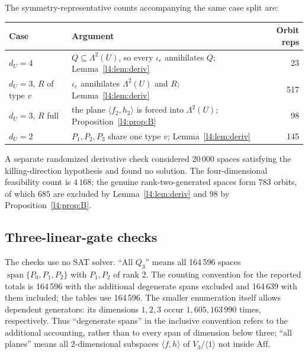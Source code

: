 \documentclass[11pt,a4paper]{article}
\theoremstyle{plain}
\theoremstyle{remark}
\newcommand{\Aff}{\mathrm{Aff}}
\newcommand{\Span}{\operatorname{span}}
\newcommand{\Lam}{\Lambda^2}
\newcommand{\dU}{d_U}
\begin{document}
The symmetry-representative counts accompanying the same case split are:
\begin{center}
\begin{tabularx}{0.92\textwidth}{@{}l X r@{}}
\toprule
Case & Argument & Orbit reps \\
\midrule
$\dU=4$ & $Q\subseteq\Lam(U)$, so every $\iota_e$ annihilates $Q$; Lemma~\ref{l4:lem:deriv} & 23\\
$\dU=3$, $R$ of type $v$ & $\iota_e$ annihilates $\Lam(U)$ and $R$; Lemma~\ref{l4:lem:deriv} & 517\\
$\dU=3$, $R$ full & the plane $\langle f_2,h_2\rangle$ is forced into $\Lam(U)$; Proposition~\ref{l4:prop:B} & 98\\
$\dU=2$ & $P_1,P_2,P_3$ share one type $v$; Lemma~\ref{l4:lem:deriv} & 145\\
\bottomrule
\end{tabularx}
\end{center}
A separate randomized derivative check considered $20\,000$ spaces satisfying the killing-direction hypothesis and found no solution. The four-dimensional feasibility count is $4\,168$; the genuine rank-two-generated spaces form $783$ orbits, of which $685$ are excluded by Lemma~\ref{l4:lem:deriv} and $98$ by Proposition~\ref{l4:prop:B}.
\subsection{Three-linear-gate checks}
The checks use no SAT solver. ``All $Q_3$'' means all 164\,596 spaces $\Span\{P_0,P_1,P_2\}$ with $P_1,P_2$ of rank 2. The counting convention for the reported totals is 164\,596 with the additional degenerate spans excluded and 164\,639 with them included; the tables use 164\,596. The smaller enumeration itself allows dependent generators: its dimensions $1,2,3$ occur $1,605,163\,990$ times, respectively. Thus ``degenerate spans'' in the inclusive convention refers to the additional accounting, rather than to every span of dimension below three; ``all planes'' means all 2-dimensional subspaces $\langle f,h\rangle$ of $V_3/\langle1\rangle$ not inside $\Aff$.
\end{document}
